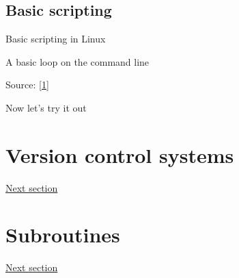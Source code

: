 \documentclass[xcolor=table,compress]{beamer}
\begin{document}
\subsection{Basic scripting}
\begin{frame}[fragile]{Basic scripting in Linux}
\begin{block}{A basic loop on the command line}
\lstset{numbers=left, stepnumber=1, frame=single, language=bash}



\end{block}
\end{frame}


\begin{frame}
\tiny{Source: \href{http://www.cyberciti.biz/faq/bash-for-loop/}{[1]}}
\end{frame}
\begin{frame}
Now let's try it out
\end{frame}

\section[VCS]{Version control systems}
\begin{frame}
\href{day1-2.pdf}{Next section}
\end{frame}

\section{Subroutines}
\begin{frame}
\href{day1-3.pdf}{Next section}
\end{frame}
\end{document}
